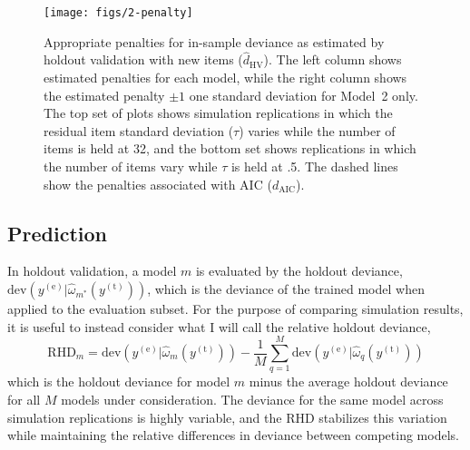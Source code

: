 
\begin{figure}
	\centering
	\texttt{[image: figs/2-penalty]}
	\caption{Appropriate penalties for in-sample deviance as estimated by holdout validation with new items ($\hat d_{\mathrm{HV}}$). The left column shows estimated penalties for each model, while the right column shows the estimated penalty $\pm 1$ one standard deviation for Model~2 only. The top set of plots shows simulation replications in which the residual item standard deviation ($\tau$) varies while the number of items is held at 32, and the bottom set shows replications in which the number of items vary while $\tau$ is held at .5.
	The dashed lines show the penalties associated with AIC ($d_\mathrm{AIC}$).}
	\label{fig:2-penalty}
\end{figure}


\subsection{Prediction}

In holdout validation, a model $m$ is evaluated by the holdout deviance,
$\mathrm{dev}(y^{(\mathrm{e})} | \hat \omega_{m^*}(y^{(\mathrm{t})}))$,
which is the deviance of the trained model when applied to the evaluation subset. For the purpose of comparing simulation results, it is useful to instead consider what I will call the relative holdout deviance,
\begin{equation}
	\mathrm{RHD}_m = \mathrm{dev}(y^{(\mathrm{e})} | \hat \omega_{m}(y^{(\mathrm{t})})) -
	                 \frac{1}{M} \sum_{q=1}^M 
	                   \mathrm{dev}(y^{(\mathrm{e})} | \hat \omega_{q}(y^{(\mathrm{t})}))
\end{equation}
which is the holdout deviance for model $m$ minus the average holdout deviance for all $M$ models under consideration. The deviance for the same model across simulation replications is highly variable, and the RHD stabilizes this variation while maintaining the relative differences in deviance between competing models.


